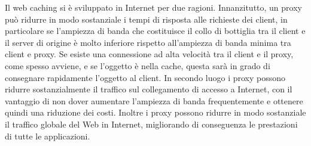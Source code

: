 Il web caching si è sviluppato in Internet per due ragioni. Innanzitutto, un proxy può ridurre in modo sostanziale i tempi di risposta alle richieste dei client, in particolare se l'ampiezza di banda che costituisce il collo di bottiglia tra il client e il server di origine è molto inferiore rispetto all'ampiezza di banda minima tra client e proxy. Se esiste una connessione ad alta velocità tra il client e il proxy, come spesso avviene, e se l'oggetto è nella cache, questa sarà in grado di consegnare rapidamente l'oggetto al client. In secondo luogo i proxy possono ridurre sostanzialmente il traffico sul collegamento di accesso a Internet, con il vantaggio di non dover aumentare l'ampiezza di banda frequentemente e ottenere quindi una riduzione dei costi. Inoltre i proxy possono ridurre in modo sostanziale il traffico globale del Web in Internet, migliorando di conseguenza le prestazioni di tutte le applicazioni.


